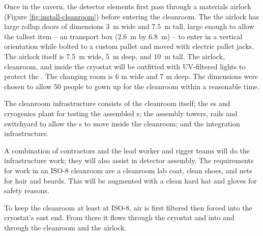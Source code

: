 Once in the cavern, the detector elements first pass through a materials airlock (Figure \ref{fig:install-cleanroom}) before entering the cleanroom. The the airlock has large rollup doors of dimensions \SI{3}{m} wide and \SI{7.5}{m} tall, large enough to allow the tallest item -- an  transport box (\SI{2.6}{m} by \SI{6.8}{m}) -- to enter in a vertical orientation while bolted to a custom pallet and moved with electric pallet jacks. The airlock itself is \SI{7.5}{m} wide, \SI{5}{m} deep, and \SI{10}{m} tall. The airlock, cleanroom, and inside the cryostat will be outfitted with UV-filtered lights to protect the . 
The changing room is 6 \si{m} wide and 7 \si{m} deep. The dimensions were chosen to allow 50 people to gown up for the cleanroom within a reasonable time. 

The cleanroom infrastructure consists of the cleanroom itself; the \coldbox{}es and cryogenics plant for testing the assembled s; the assembly towers, rails and switchyard to allow the s to move inside the cleanroom; and the  integration infrastructure. 

A combination of contractors and the lead worker and rigger teams will do the infrastructure work;   they will also assist in detector assembly. 
The requirements for work in an ISO-8 cleanroom are a cleanroom lab coat, clean shoes, and nets for hair and beards.  This will be augmented with a clean hard hat and gloves for safety reasons. 

To keep the cleanroom at least at ISO-8, air is first filtered then %
forced into the cryostat's %
east end. From there it flows %
through the cryostat and %
into and through the cleanroom and the airlock. 

